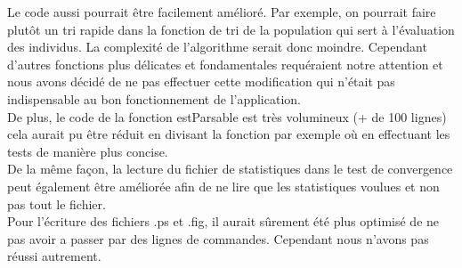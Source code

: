 \documentclass[a4paper,11pt]{article}
\begin{document}
		Le code aussi pourrait être facilement amélioré. Par exemple, on pourrait faire plutôt un tri rapide dans la fonction de tri de la population qui sert à l’évaluation des individus. La complexité de l’algorithme serait donc moindre. Cependant d’autres fonctions plus délicates et fondamentales requéraient notre attention et nous avons décidé de ne pas effectuer cette modification qui n'était pas indispensable au bon fonctionnement de l’application.\\
		De plus, le code de la fonction estParsable est très volumineux (+ de 100 lignes) cela aurait pu être réduit en divisant la fonction par exemple où en effectuant les tests de manière plus concise.\\
		De la même façon, la lecture du fichier de statistiques dans le test de convergence peut également être améliorée afin de ne lire que les statistiques voulues et non pas tout le fichier.\\
		Pour l'écriture des fichiers .ps et .fig, il aurait sûrement été plus optimisé de ne pas avoir a passer par des lignes de commandes. Cependant nous n’avons pas réussi autrement.\\
\end{document}
